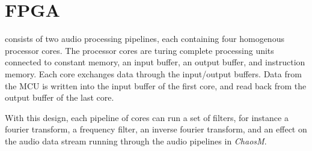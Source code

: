 \FloatBarrier
\section{FPGA}\label{chapter:fpga}

 consists of two audio processing pipelines, each containing four
homogenous processor cores. The processor cores are turing complete processing
units connected to constant memory, an input buffer, an output buffer, and
instruction memory. Each core exchanges data through the input/output buffers.
Data from the MCU is written into the input buffer of the first core, and read
back from the output buffer of the last core.

With this design, each pipeline of cores can run a set of filters, for instance
a fourier transform, a frequency filter, an inverse fourier transform, and an
effect on the audio data stream running through the audio pipelines in \textit{ChaosM}.







